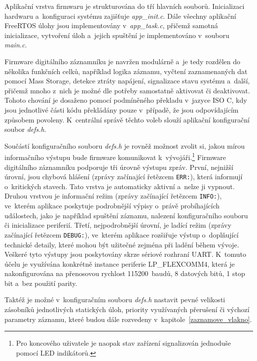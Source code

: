 Aplikační vrstva firmwaru je strukturována do tří hlavních souborů. Inicializaci hardwaru a~konfiguraci systému zajišťuje \textit{app\_init.c}. Dále všechny aplikační FreeRTOS úlohy jsou implementovány v~\textit{app\_task.c}, přičemž samotná inicializace, vytvoření úloh a~jejich spuštění je implementováno v~souboru \textit{main.c}.

Firmware digitálního záznamníku je navržen modulárně a~je tedy rozdělen do několika funkčních celků, například logika záznamu, vyčtení zaznamenaných dat pomocí Mass Storage, detekce ztráty napájení, signalizace stavu systému a~další, přičemž mnoho z~nich je možné dle potřeby samostatně aktivovat či deaktivovat. Tohoto chování je dosaženo pomocí podmíněného překladu v~jazyce ISO C, kdy jsou jednotlivé části kódu překládány pouze v~případě, že jsou odpovídajícím způsobem povoleny. K~centrální správě těchto voleb slouží aplikační konfigurační soubor \textit{defs.h}. 

Součástí konfiguračního souboru \textit{defs.h} je rovněž možnost zvolit si, jakou mírou informačního výstupu bude firmware komunikovat k~vývojáři.\footnote{Pro koncového uživatele je naopak stav zařízení signalizován jednoduše pomocí LED indikátorů.} Firmware digitálního záznamníku podporuje tři úrovně výstupu zpráv. První, nejnižší úrovní, jsou chybová hlášení (zprávy začínající řetězcem \texttt{ERR:}), která informují o~kritických stavech. Tato vrstva je automaticky aktivní a~nelze ji vypnout. Druhou vrstvou je informační režim (zprávy začínající řetězcem \texttt{INFO:}), ve~kterém aplikace poskytuje podrobnější výpisy o~právě probíhajících událostech, jako je například spuštění záznamu, nalezení konfiguračního souboru či inicializace periferií. Třetí, nejpodrobnější úrovní, je ladící režim (zprávy začínající řetězcem \texttt{DEBUG:}), ve~kterém aplikace rozšiřuje výstup o~doplňující technické detaily, které mohou být užitečné zejména při ladění během vývoje. Veškeré tyto výstupy jsou poskytovány skrze sériové rozhraní UART. K~tomuto účelu je využívána konkrétně instance periferie LP\_FLEXCOMM4, která je nakonfigurována na přenosovou rychlost 115200~baudů, 8 datových bitů, 1 stop bit a~bez použití parity.

Taktéž je možné v~konfiguračním souboru \textit{defs.h} nastavit pevné velikosti zásobníků jednotlivých statických úloh, priority využívaných přerušení či výchozí parametry záznamu, které budou dále rozvedeny v~kapitole~\ref{zaznamove_vlakno}. 

